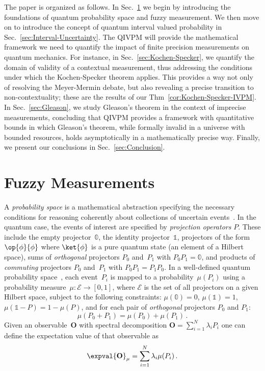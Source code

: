 \documentclass[english,reprint, aps, prl,superscriptaddress, showpacs,
showkeys, longbibliography, amsmath, amssymb]{revtex4-1}
\theoremstyle{plain}
\theoremstyle{definition}
\newcommand{\events}{\ensuremath{\mathcal{E}}}
\newcommand{\proj}[1]{\op{#1}{#1}}
\begin{document}
The paper is organized as follows.  In Sec.\ \ref{sec:fuzzy} we begin
by introducing the foundations of quantum probability space and fuzzy
measurement.  We then move on to introduce the concept of quantum
interval valued probability in Sec.\ \ref{sec:Interval-Uncertainty}.
The QIVPM will provide the mathematical framework we need to quantify the
impact of finite precision measurements on quantum mechanics.  For
instance, in Sec.\ \ref{sec:Kochen-Specker}, we quantify the domain of
validity of a contextual measurement, thus addressing the conditions
under which the Kochen-Specker theorem applies.  This provides a way
not only of resolving the Meyer-Mermin debate, but also revealing a
precise transition to non-contextuality;  these are the results of our
Thm~\ref{cor:Kochen-Specker-IVPM}.  In Sec.\ \ref{sec:Gleason}, we
study Gleason's theorem in the context of imprecise measurements,
concluding that QIVPM provides a framework with quantitative bounds in
which Gleason's theorem, while formally invalid in a universe with
bounded resources, holds asymptotically in a mathematically precise
way.  Finally, we present our conclusions in Sec.~\ref{sec:Conclusion}.

\section{Fuzzy Measurements}
\label{sec:fuzzy}

A \emph{probability space} is a mathematical abstraction specifying
the necessary conditions for reasoning coherently about collections of
uncertain
events~\cite{Kolmogorov1950,544199,Griffiths2003,Grabisch2016}. In the
quantum case, the events of interest are specified by \emph{projection
  operators} $P$. These include the empty projector~$\mathbb{0}$,
the identity projector~$\mathbb{1}$, projectors of the form
$\proj{\phi}$ where $\ket{\phi}$ is a pure quantum state (an element
of a Hilbert space), sums of \emph{orthogonal} projectors $P_0$
and~$P_1$ with $P_0P_1=\mathbb{0}$, and products of \emph{commuting}
projectors $P_0$ and~$P_1$ with $P_0P_1=P_1P_0$. In a well-defined
quantum probability
space~\cite{10.2307/2308516,gleason1957,Redhead1987-REDINA,Maassen2010},
each event~$P_{i}$ is mapped to a probability~$\mu(P_{i})$ using a
probability measure~$\mu:\events\rightarrow[0,1]$, where $\events$
is the set of all projectors on a given Hilbert space, subject to the
following constraints: $\mu(\mathbb{0})=0$, $\mu(\mathbb{1})=1$,
$\mu\left(\mathbb{1}-P\right)=1-\mu\left(P\right)$, and for each pair
of \emph{orthogonal} projectors $P_{0}$ and $P_{1}$:
\begin{equation}
{\mu}\left(P_{0}+P_{1}\right)={\mu}\left(P_{0}\right)+{\mu}\left(P_{1}\right)\,.\label{eq:QuantumProbability-Addition}
\end{equation}
Given an observable~$\mathbf{O}$ with spectral decomposition
$\mathbf{O}=\sum_{i=1}^{N}\lambda_{i}P_{i}$ one can define the 
expectation value of that observable as
\begin{equation}
\expval{\mathbf{O}}_{\mu}=\sum_{i=1}^{N}\lambda_{i}\mu(P_{i})\,.
\end{equation}
\end{document}
